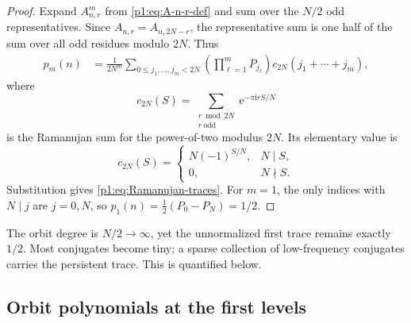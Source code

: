 \documentclass[11pt,oneside]{article}
\theoremstyle{definition}
\theoremstyle{remark}
\newcommand{\e}{\mathrm e}
\newcommand{\ii}{\mathrm i}
\begin{document}
\begin{proof}
Expand $A_{n,r}^m$ from \eqref{p1:eq:A-n-r-def} and sum over the $N/2$ odd
representatives.  Since $A_{n,r}=A_{n,2N-r}$, the representative sum is one
half of the sum over all odd residues modulo $2N$.  Thus
\begin{align*}
 p_m(n)
 &=\frac{1}{2N^m}
 \sum_{0\le j_1,\ldots,j_m<2N}
 \left(\prod_{\ell=1}^mP_{j_\ell}\right)
 c_{2N}(j_1+\cdots+j_m),
\end{align*}
where
\[
 c_{2N}(S)=\sum_{\substack{r\bmod 2N\\r\ \mathrm{odd}}}
 \e^{-\pi\ii rS/N}
\]
is the Ramanujan sum for the power-of-two modulus $2N$.  Its elementary value is
\begin{equation}\label{p1:eq:Ramanujan-power-two}
 c_{2N}(S)=
 \begin{cases}
  N(-1)^{S/N},&N\mid S,\\
  0,&N\nmid S.
 \end{cases}
\end{equation}
Substitution gives \eqref{p1:eq:Ramanujan-traces}.  For $m=1$, the only indices
with $N\mid j$ are $j=0,N$, so
$p_1(n)=\tfrac12(P_0-P_N)=1/2$.
\end{proof}

\begin{remark}
The orbit degree is $N/2\to\infty$, yet the unnormalized first trace remains
exactly $1/2$.  Most conjugates become tiny; a sparse collection of low-frequency
conjugates carries the persistent trace.  This is quantified below.
\end{remark}

\subsection{Orbit polynomials at the first levels}
\end{document}
